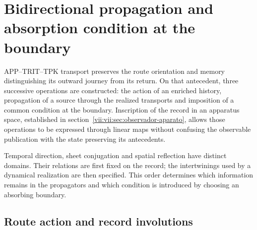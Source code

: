 
\section{Bidirectional propagation and absorption condition at the boundary}
\label{vii:vii:sec:propagacion-bidireccional}

APP--TRIT--TPK transport preserves the route orientation and memory
distinguishing its outward journey from its return. On that antecedent, three
successive operations are constructed: the action of an enriched history, propagation
of a source through the realized transports and imposition of a
common condition at the boundary. Inscription of the record in an apparatus
space, established in section~\ref{vii:vii:sec:observador-aparato}, allows
those operations to be expressed through linear maps without confusing the
observable publication with the state preserving its antecedents.

Temporal direction, sheet conjugation and spatial reflection
have distinct domains. Their relations are first fixed on the record;
the intertwinings used by a dynamical realization are then
specified. This order determines which information remains in the propagators
and which condition is introduced by choosing an absorbing boundary.

\subsection{Route action and record involutions}
\label{vii:vii:subsec:accion-bidireccional}

